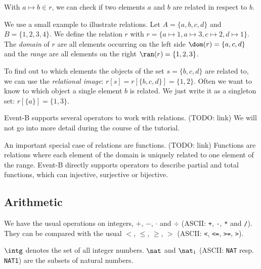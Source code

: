 With $a\mapsto b\in r$, we can check if two elements $a$ and $b$ are related in respect to $b$.

We use a small example to illustrate relations. Let $A = \{a,b,c,d\}$ and $B=\{1,2,3,4\}$.
We define the relation $r$ with $r = \{a\mapsto 1, a\mapsto 3, c\mapsto 2, d\mapsto 1\}$.
The \emph{domain} of $r$ are all elements occurring on the left side $\dom(r) = \{a,c,d\}$ and the
\emph{range} are all elements on the right $\ran(r)=\{1,2,3\}$.

To find out to which elements the objects of the set $s=\{b,c,d\}$ are related to, we can use the \emph{relational image}:
$r[s] = r[\{b,c,d\}] = \{1,2\}$.
Often we want to know to which object a single element $b$ is related. We just write it as a singleton
set: $r[\{a\}] = \{1,3\}$.

Event-B supports several operators to work with relations. (TODO: link)
We will not go into more detail during the course of the tutorial.

An important special case of relations are functions. (TODO: link) Functions are relations where each element of the
domain is uniquely related to one element of the range. Event-B directly supports operators to describe
partial and total functions, which can injective, surjective or bijective.

\subsection{Arithmetic}
\label{tut_arithmetic}
We have the usual operations on integers, $+$, $-$, $\cdot$ and $\div$ (ASCII: \texttt{+}, \texttt{-},
\texttt{*} and \texttt{/}). They can be compared with the usual $<$, $\leq$, $\geq$, $>$ (ASCII: \texttt{<}, \texttt{<=}, \texttt{>=}, \texttt{>}).

$\intg$  denotes the set of all integer numbers. $\nat$ and $\nat_1$ (ASCII: \texttt{NAT} resp. 
\texttt{NAT1}) are the subsets of natural numbers.


